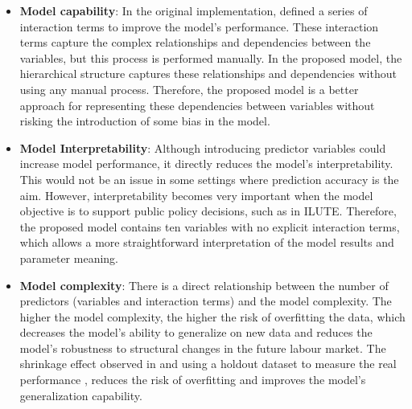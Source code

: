 \begin{itemize}
    \item \textbf{Model capability}: In the original implementation, \citet{Hain2010} defined a series of interaction terms to improve the model's performance. These interaction terms capture the complex relationships and dependencies between the variables, but this process is performed manually. In the proposed model, the hierarchical structure captures these relationships and dependencies without using any manual process. Therefore, the proposed model is a better approach for representing these dependencies between variables without risking the introduction of some bias in the model. 
    \item \textbf{Model Interpretability}: Although introducing predictor variables could increase model performance, it directly reduces the model's interpretability. This would not be an issue in some settings where prediction accuracy is the aim. However, interpretability becomes very important when the model objective is to support public policy decisions, such as in ILUTE. Therefore, the proposed model contains ten variables with no explicit interaction terms, which allows a more straightforward interpretation of the model results and parameter meaning.
    \item \textbf{Model complexity}: There is a direct relationship between the number of predictors (variables and interaction terms) and the model complexity. The higher the model complexity, the higher the risk of overfitting the data, which decreases the model's ability to generalize on new data and reduces the model's robustness to structural changes in the future labour market. The shrinkage effect observed in  and using a holdout dataset to measure the real performance , reduces the risk of overfitting and improves the model's generalization capability.

\end{itemize}
